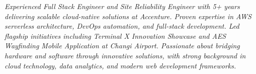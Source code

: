 
\begin{center}
    \colorbox{backgroundgray}{
        \begin{minipage}{0.95\textwidth}
            \centering
            \vspace{6pt}
            \textcolor{textgray}{\textit{Experienced Full Stack Engineer and Site Reliability Engineer with 5+ years delivering scalable cloud-native solutions at Accenture. Proven expertise in AWS serverless architecture, DevOps automation, and full-stack development. Led flagship initiatives including Terminal X Innovation Showcase and AES Wayfinding Mobile Application at Changi Airport. Passionate about bridging hardware and software through innovative solutions, with strong background in cloud technology, data analytics, and modern web development frameworks.}}
            \vspace{6pt}
        \end{minipage}
    }
\end{center}
\vspace{6pt}